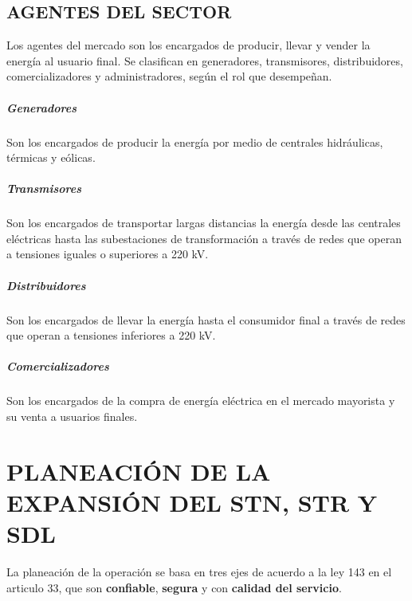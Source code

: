 \documentclass[a5paper]{book}%
\begin{document}
\section{AGENTES DEL SECTOR}
Los agentes del mercado son los encargados de producir, llevar y vender la energía al usuario final. Se clasifican en generadores, transmisores, distribuidores, comercializadores y administradores, según el rol que desempeñan.

\paragraph{Generadores}

Son los encargados de producir la energía por medio de centrales hidráulicas, térmicas y eólicas.
\paragraph{Transmisores}

Son los encargados de transportar largas distancias la energía desde las centrales eléctricas hasta las subestaciones de transformación a través de redes que operan a tensiones iguales o superiores a 220 kV.
\paragraph{Distribuidores}

Son los encargados de llevar la energía hasta el consumidor final a través de redes que operan a tensiones inferiores a 220 kV.
\paragraph{Comercializadores}

Son los encargados de la compra de energía eléctrica en el mercado mayorista y su venta a usuarios finales.

\chapter{PLANEACIÓN DE LA EXPANSIÓN DEL STN, STR Y SDL }

La planeación de la operación se basa en tres ejes de acuerdo a la ley 143 \cite{LEY143} en el articulo 33, que son \textbf{confiable}, \textbf{segura} y con \textbf{calidad del servicio}.\\
\end{document}
